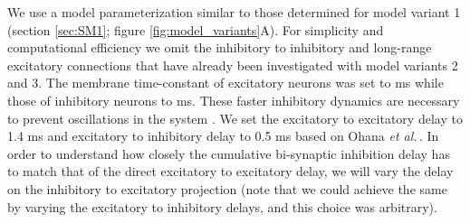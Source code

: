 \documentclass[utf8]{frontiersSCNS}
\newcommand{\etal}{\textit{et al.}}
\begin{document}
We use a model parameterization similar to those determined for 
model variant 1 (section \ref{sec:SM1}; figure \ref{fig:model_variants}A). For simplicity and computational efficiency we omit the inhibitory to inhibitory and long-range excitatory connections that have already been investigated with model variants 2 and 3. The membrane time-constant of excitatory neurons was set to ms while those of inhibitory neurons to ms. These faster inhibitory dynamics are necessary to prevent oscillations in the system \citep{Kang2003}. We set the excitatory to excitatory delay to 1.4 ms and excitatory to inhibitory delay to 0.5 ms based on Ohana \etal\,\citep{Ohana2012}. In order to understand how closely the 
cumulative bi-synaptic inhibition delay has to match that of the direct excitatory to excitatory delay, we will vary the delay on the inhibitory to excitatory projection (note that we could achieve the same by varying the excitatory
to inhibitory delays, and this choice was arbitrary). 
 
\end{document}
